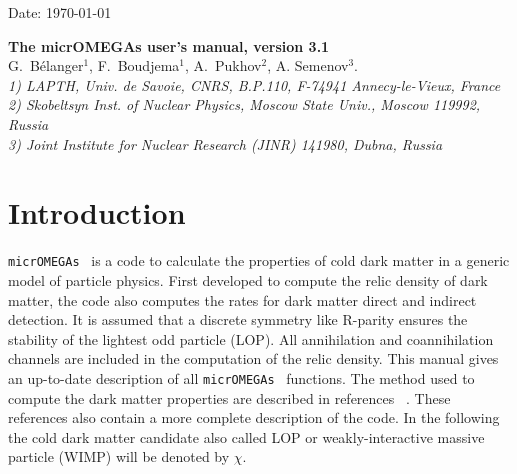 \documentclass[12pt,a4paper]{article}
\begin{document}
\def\micro{{\tt micrOMEGAs}}
\def\ra{\rightarrow}
\def\calchep{{\tt CalcHEP}}

\def\suspect{{\tt SuSpect}}
\def\mbmb{m_b(m_b)}
\def\mt{m_t}
\def\dMb{\Delta m_b}
\def\dMq{\Delta m_q}
\def\delrho{\Delta\rho}
\def\bsgamma{b\to s\gamma}
\def\bsmu{B_s\to \mu^+\mu^-}
\def\gmuon{(g-2)_\mu}
\def\noi{\noindent}
\def\VERSION{3.1}


\begin{flushright}
   \vspace*{-18mm}
   Date: \today
\end{flushright}
\vspace*{2mm}




\begin{center}


{\Large\bf The  micrOMEGAs user's manual, version 3.1} \\[8mm]

{\large   G.~B\'elanger$^1$, F.~Boudjema$^1$, A.~Pukhov$^2$,  A. Semenov$^3$.}\\[4mm]

{\it 1) LAPTH, Univ. de Savoie, CNRS, B.P.110,  F-74941 Annecy-le-Vieux, France\\
     2) Skobeltsyn Inst. of Nuclear Physics, Moscow State Univ., Moscow 119992, Russia\\
     3) Joint Institute for Nuclear Research (JINR) 141980, Dubna,  Russia\\}
\end{center}

\begin{abstract}
We give an up-to-date description of micrOMEGAs functions. Only the routines which are available for
the users are described.  Examples on how to use these functions
can be found in the sample main programs distributed with the code. 
\end{abstract}




\section{Introduction}
\micro~ is a code 
 to calculate the properties of cold dark matter  in a generic model of particle physics.  
 First developed to compute the relic density of dark matter, 
 the code also computes the rates for dark matter direct and  indirect detection. 
 It is assumed that a discrete symmetry like R-parity ensures the stability of the lightest 
 odd particle (LOP). 
All annihilation and coannihilation channels are included in the computation of the relic density. 
This manual gives an up-to-date description of all \micro~ functions.  
The method used to compute the dark matter properties are described 
in references 
~\cite{Belanger:2001fz,Belanger:2004yn,Belanger:2006is,Belanger:2008sj,Belanger:2010gh,Belanger:2013oya}.
These references also contain  a more complete description of the code. In the following
the cold dark matter candidate also called LOP or weakly-interactive massive particle (WIMP)
will be denoted by $\chi$. 
\end{document}
